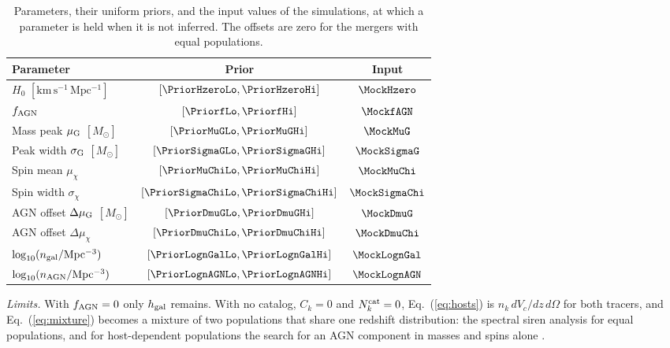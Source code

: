 \documentclass[aps,prd,reprint,superscriptaddress,nofootinbib,nolongbibliography,floatfix]{revtex4-2}
\newcommand{\Msun}{M_\odot}
\newcommand{\fagn}{f_{\rm AGN}}
\newcommand{\dmug}{\Delta\mu_{\rm G}}
\newcommand{\dmuchi}{\Delta\mu_{\chi}}
\begin{document}
\begin{table}
\caption{Parameters, their uniform priors, and the input values of the simulations, at which a parameter is held when it is not inferred.
The offsets are zero for the mergers with equal populations.}
\label{tab:priors}
\begin{ruledtabular}
\begin{tabular}{lcc}
Parameter & Prior & Input\\
\hline
$H_0$ $[\mathrm{km\,s^{-1}\,Mpc^{-1}}]$ & $[\PriorHzeroLo,\PriorHzeroHi]$ & $\MockHzero$\\
$\fagn$ & $[\PriorfLo,\PriorfHi]$ & $\MockfAGN$\\
Mass peak $\mu_{\rm G}$ $[\Msun]$ & $[\PriorMuGLo,\PriorMuGHi]$ & $\MockMuG$\\
Peak width $\sigma_{\rm G}$ $[\Msun]$ & $[\PriorSigmaGLo,\PriorSigmaGHi]$ & $\MockSigmaG$\\
Spin mean $\mu_\chi$ & $[\PriorMuChiLo,\PriorMuChiHi]$ & $\MockMuChi$\\
Spin width $\sigma_\chi$ & $[\PriorSigmaChiLo,\PriorSigmaChiHi]$ & $\MockSigmaChi$\\
AGN offset $\dmug$ $[\Msun]$ & $[\PriorDmuGLo,\PriorDmuGHi]$ & $\MockDmuG$\\
AGN offset $\dmuchi$ & $[\PriorDmuChiLo,\PriorDmuChiHi]$ & $\MockDmuChi$\\
$\log_{10}(n_{\rm gal}/{\rm Mpc^{-3}})$ & $[\PriorLognGalLo,\PriorLognGalHi]$ & $\MockLognGal$\\
$\log_{10}(n_{\rm AGN}/{\rm Mpc^{-3}})$ & $[\PriorLognAGNLo,\PriorLognAGNHi]$ & $\MockLognAGN$\\
\end{tabular}
\end{ruledtabular}
\end{table}

\textit{Limits.}
With $\fagn=0$ only $h_{\rm gal}$ remains.
With no catalog, $C_k=0$ and $N_k^{\rm cat}=0$, Eq.~(\ref{eq:hosts}) is $n_k\,dV_c/dz\,d\Omega$ for both tracers, and Eq.~(\ref{eq:mixture}) becomes a mixture of two populations that share one redshift distribution: the spectral siren analysis for equal populations, and for host-dependent populations the search for an AGN component in masses and spins alone \cite{Gayathri:2023bha,Bartos:2026xlt}.
\end{document}

